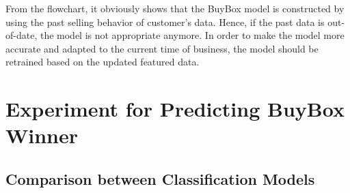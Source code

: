 From the flowchart, it obviously shows that the BuyBox model is constructed by using the past selling behavior of customer's data. Hence, if the past data is out-of-date, the model is not appropriate anymore.
In order to make the model more accurate and adapted to the current time of business, the model should be retrained based on the updated featured data.

\section{Experiment for Predicting BuyBox Winner}
\label{sec:expbuyboxmodel}

\subsection{Comparison between Classification Models}
\label{sec:comparemodels}


